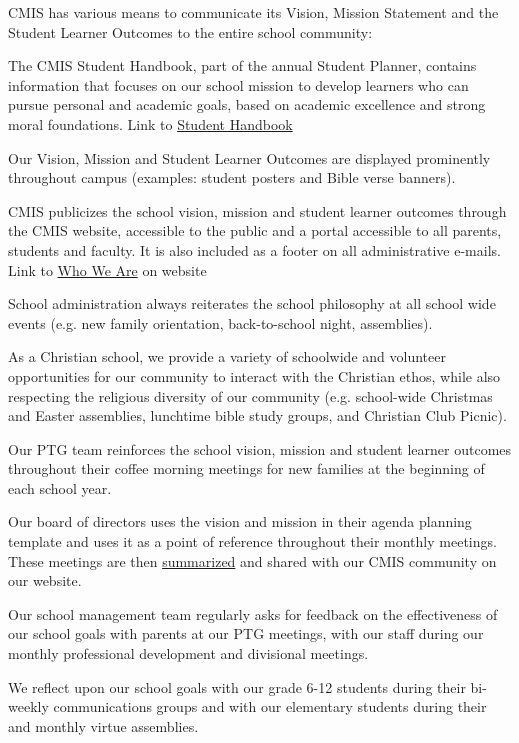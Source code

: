 \begin{findings}
CMIS has various means to communicate its Vision, Mission Statement and the Student Learner Outcomes to the entire school community:

The CMIS Student Handbook, part of the annual Student Planner, contains information that focuses on our school mission to develop learners who can pursue personal and academic goals, based on academic excellence and strong moral foundations. Link to \href{https://docs.google.com/document/d/1bIbV9pgGz2vpXYJdnRzL_Od5PS35egy7lgBOBuszgD4/edit}{Student Handbook}

Our Vision, Mission and Student Learner Outcomes are displayed prominently throughout campus (examples: student posters and Bible verse banners). 

CMIS publicizes the school vision, mission and student learner outcomes through the CMIS website, accessible to the public and a portal accessible to all parents, students and faculty. It is also included as a footer on all administrative e-mails.  Link to \href{http://cmis.ac.th/about/vision}{Who We Are} on website

School administration always reiterates the school philosophy at all school wide events (e.g. new family orientation, back-to-school night, assemblies). 

As a Christian school, we provide a variety of schoolwide and volunteer opportunities for our community to interact with the Christian ethos, while also respecting the religious diversity of our community (e.g. school-wide Christmas and Easter assemblies, lunchtime bible study groups, and Christian Club Picnic).

Our PTG team reinforces the school vision, mission and student learner outcomes throughout their coffee morning meetings for new families at the beginning of each school year. 

Our board of directors uses the vision and mission in their agenda planning template and uses it as a point of reference throughout their monthly meetings. These meetings are then \href{http://blogs.cmis.ac.th/ptg/public-board-minutes/}{summarized} and shared with our CMIS community on our website.

Our school management team regularly asks for feedback on the effectiveness of our school goals with parents at our PTG meetings, with our staff during our monthly professional development and divisional meetings.

We reflect upon our school goals with our grade 6-12 students during their bi-weekly communications groups and with our elementary students during their and monthly virtue assemblies.


\end{findings}
